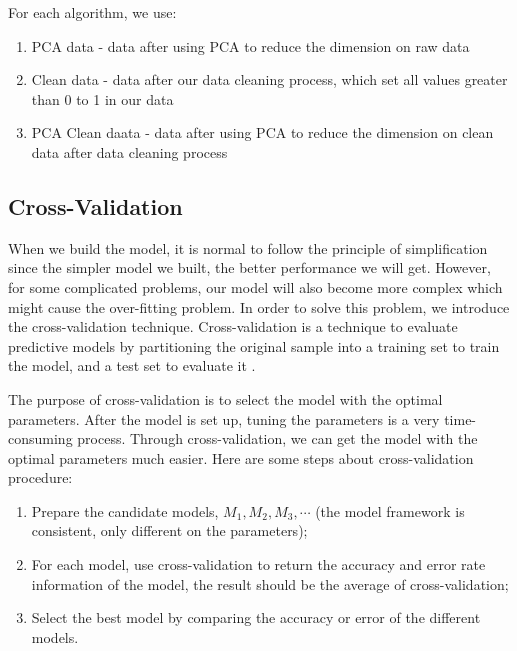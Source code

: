 \documentclass[sigconf]{acmart}
\begin{document}
For each algorithm, we use:
\begin{enumerate}
    \item PCA data - data after using PCA to reduce the dimension on raw data
    \item Clean data - data after our data cleaning process, which set all values greater than 0 to 1 in our data
    \item PCA Clean daata - data after using PCA to reduce the dimension on clean data after data cleaning process
\end{enumerate}

\subsection{Cross-Validation}

When we build the model, it is normal to follow the principle of simplification since the simpler model we built, the better performance we will get. However, for some complicated problems, our model will also become more complex which might cause the over-fitting problem. In order to solve this problem, we introduce the cross-validation technique. Cross-validation is a technique to evaluate predictive models by partitioning the original sample into a training set to train the model, and a test set to evaluate it \cite{10f.cv}.

The purpose of cross-validation is to select the model with the optimal parameters. After the model is set up, tuning the parameters is a very time-consuming process. Through cross-validation, we can get the model with the optimal parameters much easier. Here are some steps about cross-validation procedure:
\begin{enumerate}
    \item Prepare the candidate models, $M_1,M_2,M_3,\cdots$ (the model framework is consistent, only different on the parameters);
    \item For each model, use cross-validation to return the accuracy and error rate information of the model, the result should be the average of cross-validation;
    \item Select the best model by comparing the accuracy or error of the different models.
\end{enumerate}
\end{document}
